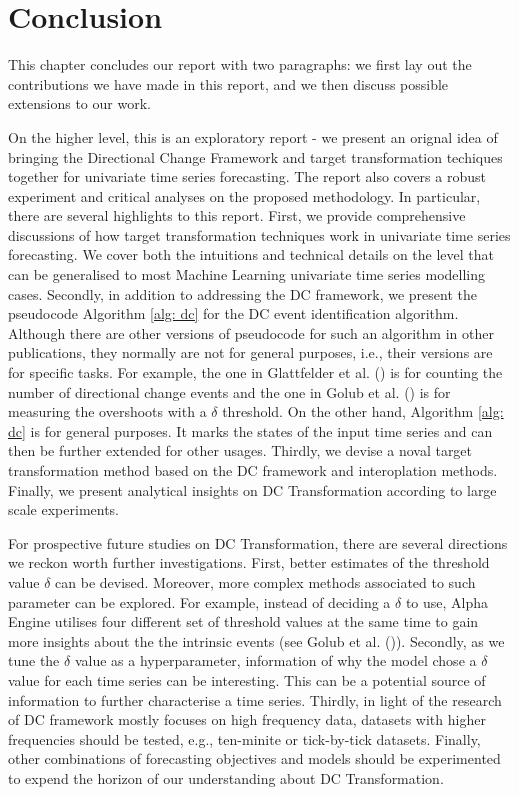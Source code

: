 \chapter{Conclusion}
This chapter concludes our report with two paragraphs: we first lay out the contributions we have made in this report, and we then discuss possible extensions to our work.

On the higher level, this is an exploratory report - we present an orignal idea of bringing the Directional Change Framework and target transformation techiques together for univariate time series forecasting. The report also covers a robust experiment and critical analyses on the proposed methodology. In particular, there are several highlights to this report. First, we provide comprehensive discussions of how target transformation techniques work in univariate time series forecasting. We cover both the intuitions and technical details on the level that can be generalised to most Machine Learning univariate time series modelling cases. Secondly, in addition to addressing the DC framework, we present the pseudocode Algorithm \ref{alg: dc} for the DC event identification algorithm. Although there are other versions of pseudocode for such an algorithm in other publications, they normally are not for general purposes, i.e., their versions are for specific tasks. For example, the one in Glattfelder et al. (\citeyear{glattfelder2011patterns}) is for counting the number of directional change events and the one in Golub et al. (\citeyear{golub2016multi}) is for measuring the overshoots with a $\delta$ threshold. On the other hand, Algorithm \ref{alg: dc} is for general purposes. It marks the states of the input time series and can then be further extended for other usages. Thirdly, we devise a noval target transformation method based on the DC framework and interoplation methods. Finally, we present analytical insights on DC Transformation according to large scale experiments.

For prospective future studies on DC Transformation, there are several directions we reckon worth further investigations. First, better estimates of the threshold value $\delta$ can be devised. Moreover, more complex methods associated to such parameter can be explored. For example, instead of deciding a $\delta$ to use, Alpha Engine utilises four different set of threshold values at the same time to gain more insights about the the intrinsic events (see Golub et al. (\citeyear{golub2018alpha})). Secondly, as we tune the $\delta$ value as a hyperparameter, information of why the model chose a $\delta$ value for each time series can be interesting. This can be a potential source of information to further characterise a time series. Thirdly, in light of the research of DC framework mostly focuses on high frequency data, datasets with higher frequencies should be tested, e.g., ten-minite or tick-by-tick datasets. Finally, other combinations of forecasting objectives and models should be experimented to expend the horizon of our understanding about DC Transformation.
